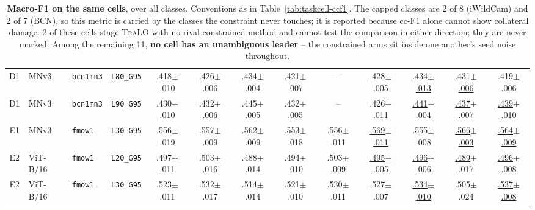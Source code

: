 \begin{table}[t]
{\begin{tabular}{cllc ccccccccc}
\midrule
D1 & MNv3 & \texttt{bcn1mn3} & \texttt{L80\_G95} & .418{\tiny $\pm$.010} & .426{\tiny $\pm$.006} & .434{\tiny $\pm$.004} & .421{\tiny $\pm$.007} & -- & .428{\tiny $\pm$.005} & \underline{.434{\tiny $\pm$.013}} & \underline{.431{\tiny $\pm$.006}} & .419{\tiny $\pm$.006} \\
D1 & MNv3 & \texttt{bcn1mn3} & \texttt{L90\_G95} & .430{\tiny $\pm$.010} & .432{\tiny $\pm$.006} & .445{\tiny $\pm$.005} & .432{\tiny $\pm$.005} & -- & .426{\tiny $\pm$.011} & \underline{.441{\tiny $\pm$.004}} & \underline{.437{\tiny $\pm$.007}} & \underline{.439{\tiny $\pm$.010}} \\
\midrule
E1 & MNv3 & \texttt{fmow1} & \texttt{L30\_G95} & .556{\tiny $\pm$.019} & .557{\tiny $\pm$.009} & .562{\tiny $\pm$.009} & .553{\tiny $\pm$.018} & .556{\tiny $\pm$.011} & \underline{.569{\tiny $\pm$.011}} & .555{\tiny $\pm$.008} & \underline{.566{\tiny $\pm$.003}} & \underline{.564{\tiny $\pm$.009}} \\
\midrule
E2 & ViT-B/16 & \texttt{fmow1} & \texttt{L20\_G95} & .497{\tiny $\pm$.011} & .503{\tiny $\pm$.016} & .488{\tiny $\pm$.014} & .494{\tiny $\pm$.010} & .503{\tiny $\pm$.009} & \underline{.495{\tiny $\pm$.005}} & \underline{.496{\tiny $\pm$.006}} & \underline{.489{\tiny $\pm$.017}} & \underline{.496{\tiny $\pm$.008}} \\
E2 & ViT-B/16 & \texttt{fmow1} & \texttt{L30\_G95} & .523{\tiny $\pm$.011} & .532{\tiny $\pm$.017} & .514{\tiny $\pm$.014} & .521{\tiny $\pm$.010} & .530{\tiny $\pm$.011} & .527{\tiny $\pm$.007} & \underline{.534{\tiny $\pm$.010}} & .505{\tiny $\pm$.024} & \underline{.537{\tiny $\pm$.008}} \\
\bottomrule
\end{tabular}}
\caption{\textbf{Macro-F1 on the same cells}, over all classes. Conventions as in Table~\ref{tab:taskcell-ccf1}. The capped classes are 2 of 8 (iWildCam) and 2 of 7 (BCN), so this metric is carried by the classes the constraint never touches; it is reported because cc-F1 alone cannot show collateral damage. 2 of these cells stage \textsc{TraLO} with no rival constrained method and cannot test the comparison in either direction; they are never marked. Among the remaining 11, \textbf{no cell has an unambiguous leader} -- the constrained arms sit inside one another's seed noise throughout.}
\label{tab:taskcell-macrof1}
\end{table}
